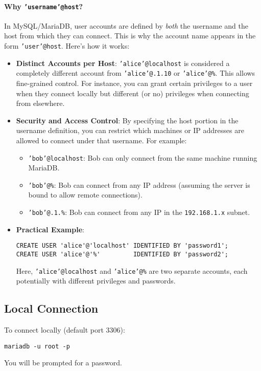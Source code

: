 \documentclass[10pt]{article}
\begin{document}
\paragraph{Why \texttt{'username'@\textquotesingle host\textquotesingle}?}
In MySQL/MariaDB, user accounts are defined by \emph{both} the username and the host from which they can connect. This is why the account name appears in the form \texttt{'user'@\textquotesingle host\textquotesingle}. Here’s how it works:
\begin{itemize}
    \item \textbf{Distinct Accounts per Host}: \texttt{'alice'@\textquotesingle localhost\textquotesingle} is considered a completely different account from \texttt{'alice'@.1.10\textquotesingle} or \texttt{'alice'@\textquotesingle \%\textquotesingle}. This allows fine-grained control. For instance, you can grant certain privileges to a user when they connect locally but different (or no) privileges when connecting from elsewhere.
    \item \textbf{Security and Access Control}: By specifying the host portion in the username definition, you can restrict which machines or IP addresses are allowed to connect under that username. For example:
    \begin{itemize}
        \item \texttt{'bob'@\textquotesingle localhost\textquotesingle}: Bob can only connect from the same machine running MariaDB.
        \item \texttt{'bob'@\textquotesingle \%\textquotesingle}: Bob can connect from any IP address (assuming the server is bound to allow remote connections).
        \item \texttt{'bob'@.1.\%\textquotesingle}: Bob can connect from any IP in the \texttt{192.168.1.x} subnet.
    \end{itemize}
    \item \textbf{Practical Example}:
\begin{lstlisting}
CREATE USER 'alice'@'localhost' IDENTIFIED BY 'password1';
CREATE USER 'alice'@'%'         IDENTIFIED BY 'password2';
\end{lstlisting}
Here, \texttt{'alice'@\textquotesingle localhost\textquotesingle} and \texttt{'alice'@\textquotesingle \%\textquotesingle} are two separate accounts, each potentially with different privileges and passwords.
\end{itemize}


\subsection{Local Connection}
To connect locally (default port 3306):
\begin{lstlisting}
mariadb -u root -p
\end{lstlisting}
You will be prompted for a password.
\end{document}
